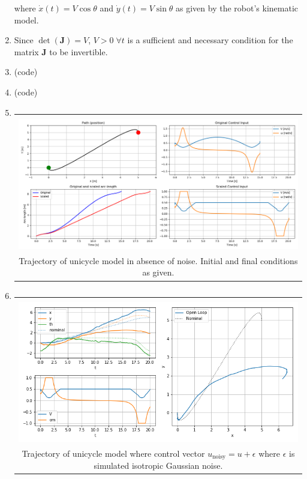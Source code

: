\documentclass{article}
\begin{document}
\begin{enumerate}[label=(\roman*)]
where $\dot{x}(t)=V\cos\theta$ and $\dot{y}(t)=V\sin\theta$ as given by the robot's kinematic model.


\item %
Since $\det(\bm{J})=V$, $V>0\; \forall t$ is a sufficient and necessary condition for the matrix $\bm{J}$ to be invertible.

\item %
(code)

\item %
(code)

\item %
\begin{tabular}[t]{c}
	\hline \\
	\includegraphics[width=1.0\textwidth]{img/differential_flatness.png} \\
	Trajectory of unicycle model in absence of noise. Initial and final conditions as given. \\
	\hline
\end{tabular}

\item %
\begin{tabular}[t]{c}
	\hline \\
	\includegraphics[width=1.0\textwidth]{img/sim_traj_openloop.png} \\
	Trajectory of unicycle model where control vector $u_\text{noisy}=u + \epsilon$ where $\epsilon$ is simulated isotropic Gaussian noise. \\
	\hline
\end{tabular}


\end{enumerate}
\end{document}

